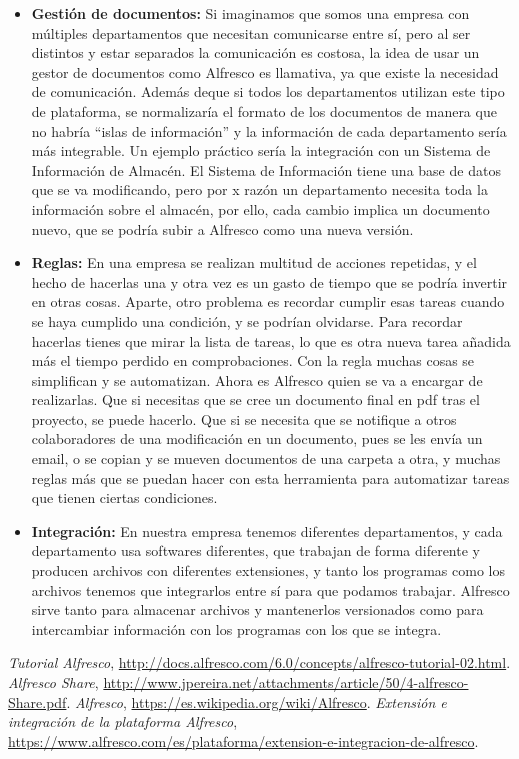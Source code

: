 \documentclass{article}
\begin{document}
\begin{itemize}
\item \textbf{Gestión de documentos:} Si imaginamos que somos una empresa con múltiples departamentos que necesitan comunicarse entre sí, pero al ser distintos y estar separados la 
comunicación es costosa, la idea de usar un gestor de documentos como Alfresco es llamativa, ya que existe la necesidad de comunicación. Además deque si todos los departamentos utilizan este tipo de plataforma, se normalizaría el formato de los documentos de manera que no habría “islas de información” y la información de cada departamento sería más integrable. Un ejemplo práctico sería la integración con un Sistema de Información de Almacén. El Sistema de Información tiene una base de datos que se va modificando, pero por x razón un departamento necesita toda la información sobre el almacén, por ello, cada cambio implica un documento nuevo, que se podría subir a Alfresco como una nueva versión.
\item \textbf{Reglas:} En una empresa se realizan multitud de acciones repetidas, y el hecho de hacerlas una y otra vez es un gasto de tiempo que se podría invertir en otras cosas. Aparte, otro problema es recordar cumplir esas tareas cuando se haya cumplido una condición, y se podrían olvidarse. Para recordar hacerlas tienes que mirar la lista de tareas, lo que es otra nueva tarea añadida más el tiempo perdido en comprobaciones. Con la regla muchas cosas se simplifican y se automatizan. Ahora es Alfresco quien se va a encargar de realizarlas. Que si necesitas que se cree un documento final en pdf tras el proyecto, se puede hacerlo. Que si se necesita que se notifique a otros colaboradores de una modificación en un documento, pues se les envía un email, o se copian y se mueven documentos de una carpeta a otra, y muchas reglas más que se puedan hacer con esta herramienta para automatizar tareas que tienen ciertas condiciones.  
\item \textbf{Integración:} En nuestra empresa tenemos diferentes departamentos, y cada departamento usa softwares diferentes, que trabajan de forma diferente y producen archivos con diferentes extensiones, y tanto los programas como los archivos tenemos que integrarlos entre sí para que podamos trabajar. Alfresco sirve tanto para almacenar archivos y mantenerlos versionados como para intercambiar información con los programas con los que se integra.

\end{itemize}


\begin{thebibliography}{9}

 \textit{Tutorial Alfresco}, \url{http://docs.alfresco.com/6.0/concepts/alfresco-tutorial-02.html}.
 \textit{Alfresco Share}, \url{http://www.jpereira.net/attachments/article/50/4-alfresco-Share.pdf}.
 \textit{Alfresco}, \url{https://es.wikipedia.org/wiki/Alfresco}.
 \textit{Extensión e integración de la plataforma Alfresco}, \url{https://www.alfresco.com/es/plataforma/extension-e-integracion-de-alfresco}.

\end{thebibliography}
\end{document}
